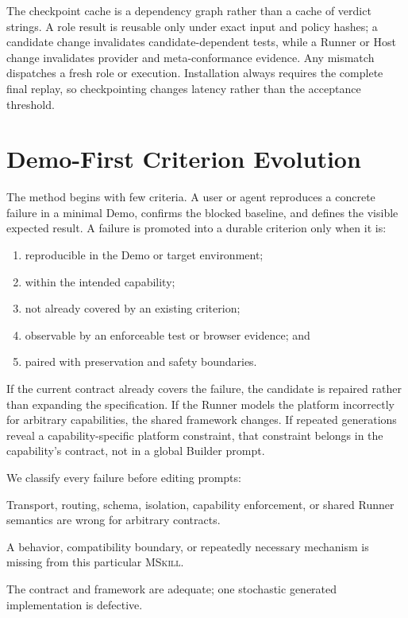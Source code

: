 \documentclass[10pt]{article}
\newcommand{\mskill}{\textsc{MSkill}\xspace}
\begin{document}
The checkpoint cache is a dependency graph rather than a cache of verdict strings. A role
result is reusable only under exact input and policy hashes; a candidate change invalidates
candidate-dependent tests, while a Runner or Host change invalidates provider and
meta-conformance evidence. Any mismatch dispatches a fresh role or execution. Installation
always requires the complete final replay, so checkpointing changes latency rather than the
acceptance threshold.

\section{Demo-First Criterion Evolution}

The method begins with few criteria. A user or agent reproduces a concrete failure in a minimal Demo, confirms the blocked baseline, and defines the visible expected result. A failure is promoted into a durable criterion only when it is:

\begin{enumerate}[leftmargin=*]
  \item reproducible in the Demo or target environment;
  \item within the intended capability;
  \item not already covered by an existing criterion;
  \item observable by an enforceable test or browser evidence; and
  \item paired with preservation and safety boundaries.
\end{enumerate}

If the current contract already covers the failure, the candidate is repaired rather than expanding the specification. If the Runner models the platform incorrectly for arbitrary capabilities, the shared framework changes. If repeated generations reveal a capability-specific platform constraint, that constraint belongs in the capability's contract, not in a global Builder prompt.

We classify every failure before editing prompts:

\begin{description}[leftmargin=3.2cm,style=nextline]
  \item[Global framework] Transport, routing, schema, isolation, capability enforcement, or shared Runner semantics are wrong for arbitrary contracts.
  \item[Capability contract] A behavior, compatibility boundary, or repeatedly necessary mechanism is missing from this particular \mskill{}.
  \item[Candidate only] The contract and framework are adequate; one stochastic generated implementation is defective.
\end{description}
\end{document}
